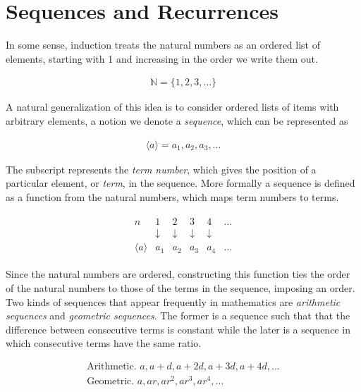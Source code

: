 \section{Sequences and Recurrences}

In some sense, induction treats the natural numbers as an ordered list of elements, starting with 1 and increasing in the order we write them out.

\begin{align*}
	\mathbb{N} = \{ 1, 2, 3, \dots \}
\end{align*}

A natural generalization of this idea is to consider ordered lists of items with arbitrary elements, a notion we denote a \emph{sequence}, which can be represented as

\begin{align*}
	\langle a \rangle = a_1, a_2, a_3, \dots
\end{align*}

The subscript represents the \emph{term number}, which gives the position of a particular element, or \emph{term}, in the sequence. More formally a sequence is defined as a function from the natural numbers, which maps term numbers to terms.

\begin{align*}
	\begin{array}{rrrrrr}
		n & 1 & 2 & 3 & 4 & \dots \\
		& \downarrow & \downarrow & \downarrow & \downarrow & \\
		\langle a \rangle & a_1 & a_2 & a_3 & a_4 & \dots
	\end{array}
\end{align*}

Since the natural numbers are ordered, constructing this function ties the order of the natural numbers to those of the terms in the sequence, imposing an order. Two kinds of sequences that appear frequently in mathematics are \emph{arithmetic sequences} and \emph{geometric sequences}. The former is a sequence such that that the difference between consecutive terms is constant while the later is a sequence in which consecutive terms have the same ratio.

\begin{align*}
	\text{Arithmetic. } a, a + d, a + 2d, a + 3d, a + 4d, \dots \\
	\text{Geometric. } a, ar, ar^2, ar^3, ar^4, \dots \\
\end{align*}

